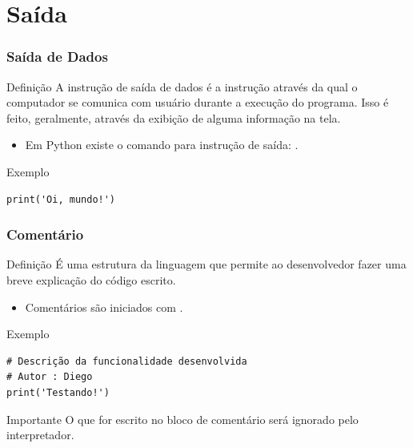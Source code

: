 \documentclass[aspectratio=169]{beamer} %
\begin{document}
\section{Saída}

\begin{frame}[fragile]
\frametitle{Saída de Dados}

\begin{block}{Definição}
	A instrução de saída de dados é a instrução através da qual o computador se comunica com usuário durante a execução do programa. Isso é feito, geralmente, através da exibição de alguma informação na tela.
\end{block}\vfill

\begin{itemize}
	\item Em Python existe o comando para instrução de saída: .
\end{itemize}\vfill

\begin{exampleblock}{Exemplo}
\begin{lstlisting}
print('Oi, mundo!')
\end{lstlisting}
\end{exampleblock}
\end{frame}

\begin{frame}[fragile]
\frametitle{Comentário}

\begin{block}{Definição}
É uma estrutura da linguagem que permite ao desenvolvedor fazer uma breve explicação do código escrito.
\end{block}\vfill

\begin{itemize}
	\item Comentários são iniciados com \structure{\#}.
\end{itemize}\vfill

\begin{exampleblock}{Exemplo}
	\begin{lstlisting}
# Descrição da funcionalidade desenvolvida
# Autor : Diego
print('Testando!')
	\end{lstlisting}
\end{exampleblock}\vfill

\begin{alertblock}{Importante}
O que for escrito no bloco de comentário será ignorado pelo interpretador.
\end{alertblock}
\end{frame}
\end{document}
